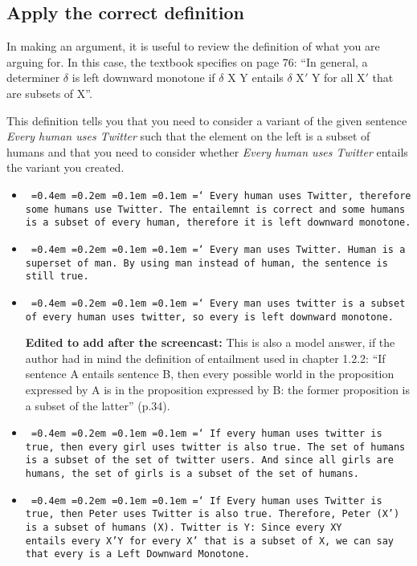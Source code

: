 \documentclass[a4,11pt]{article}
\newcommand*\justify{%
  \fontdimen2\font=0.4em%
  \fontdimen3\font=0.2em%
  \fontdimen4\font=0.1em%
  \fontdimen7\font=0.1em%
  \hyphenchar\font=`\-%
}
\begin{document}
\subsection*{Apply the correct definition}

In making an argument, it is useful to review the definition of what you are arguing for. In this case, the textbook specifies on page 76: ``In general, a determiner $\delta$ is left downward monotone if $\delta$ X Y entails $\delta$ X$'$ Y for all X$'$ that are subsets of X''. 

This definition tells you that you need to consider a variant of the given sentence {\em Every human uses Twitter} such that the element on the left is a subset of humans and that you need to consider whether {\em Every human uses Twitter} entails the variant you created.

\begin{itemize}[leftmargin = 12pt]

\item \texttt{\justify Every human uses Twitter, therefore some humans use Twitter. The entailemnt is correct and some humans is a subset of every human, therefore it is left downward monotone.}

\item \texttt{\justify Every man uses Twitter. Human is a superset of man. By using man instead of human, the sentence is still true.}

\item \texttt{\justify Every man uses twitter is a subset of every human uses twitter, so every is left downward monotone.}

{\bf Edited to add after the screencast:} This is also a model answer, if the author had in mind the definition of entailment used in chapter 1.2.2: ``If sentence A entails sentence B, then every possible world in the proposition expressed by A is in the proposition expressed by B: the former proposition is a subset of the latter'' (p.34).

\item \texttt{\justify If every human uses twitter is true, then every girl uses twitter is also true. The set of humans is a subset of the set of twitter users. And since all girls are humans, the set of girls is a subset of the set of humans.}

\item \texttt{\justify If Every human uses Twitter is true, then Peter uses Twitter is also true. Therefore, Peter (X') is a subset of humans (X). Twitter is Y: Since every XY entails every X'Y for every X' that is a subset of X, we can say that every is a Left Downward Monotone.}


\end{itemize}
\end{document}
